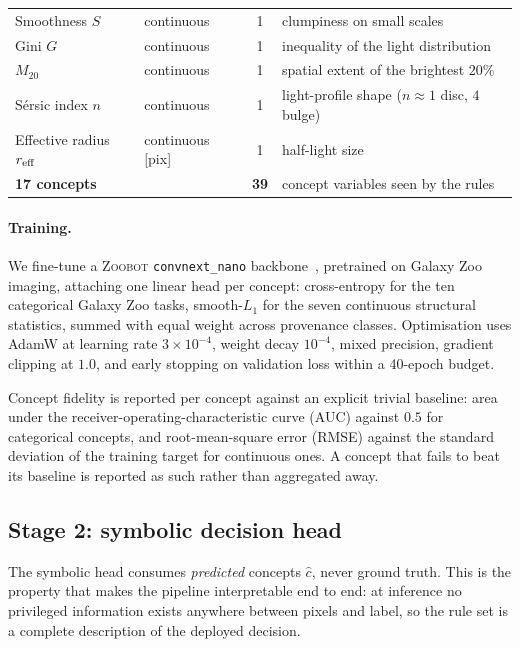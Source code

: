\documentclass[11pt]{article}
\newcommand{\code}[1]{\texttt{\small #1}}
\begin{document}
\begin{table}[htbp]
\begin{tabular}{llcl}
Smoothness $S$         & continuous & 1 & clumpiness on small scales \\
Gini $G$               & continuous & 1 & inequality of the light distribution \\
$M_{20}$               & continuous & 1 & spatial extent of the brightest $20\%$ \\
S\'ersic index $n$     & continuous & 1 & light-profile shape ($n\!\approx\!1$ disc, $4$ bulge) \\
Effective radius $r_{\rm eff}$ & continuous [pix] & 1 & half-light size \\
\midrule
\textbf{17 concepts} & & \textbf{39} & concept variables seen by the rules \\
\bottomrule
\end{tabular}
\end{table}

\paragraph{Training.}
We fine-tune a \textsc{Zoobot} \code{convnext\_nano}
backbone~\citep{walmsley2023zoobot,liu2022convnext}, pretrained on Galaxy Zoo
imaging, attaching one linear head per concept: cross-entropy for the ten
categorical Galaxy Zoo tasks, smooth-$L_1$ for the seven continuous structural
statistics, summed with equal weight across provenance classes. Optimisation
uses AdamW at learning rate $3\times10^{-4}$, weight decay $10^{-4}$, mixed
precision, gradient clipping at $1.0$, and early stopping on validation loss
within a 40-epoch budget.

Concept fidelity is reported per concept against an explicit trivial baseline:
area under the receiver-operating-characteristic curve (AUC) against $0.5$ for
categorical concepts, and root-mean-square error (RMSE) against the standard
deviation of the training target for continuous ones. A concept that fails to beat its baseline is reported as such rather
than aggregated away.

\subsection{Stage 2: symbolic decision head}
\label{sec:stage2}

The symbolic head consumes \emph{predicted} concepts $\hat c$, never ground
truth. This is the property that makes the pipeline interpretable end to end:
at inference no privileged information exists anywhere between pixels and
label, so the rule set is a complete description of the deployed decision.
\end{document}
